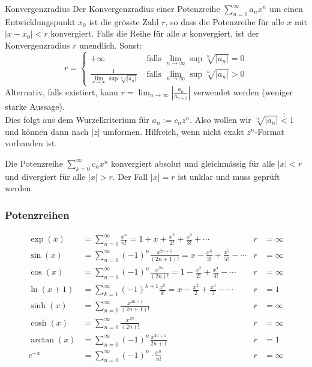 \documentclass[a4paper,10pt]{article}
\def\limn{\lim_{n\to \infty}}
\def\sumk{\sum_{k=1}^\infty}
\def\sumn{\sum_{n=0}^\infty}
\begin{document}
\begin{mainbox}{Konvergenzradius}
 Der Konvergenzradius einer Potenzreihe $\sumn a_n x^n$ um einen Entwicklungspunkt $x_0$ ist die grösste Zahl $r$, so dass die Potenzreihe für alle $x$ mit $|x - x_0| < r$ konvergiert. Falls die Reihe für alle $x$ konvergiert, ist der Konvergenzradius $r$ unendlich. Sonst:
 $$r = \begin{cases}
    +\infty & \text{ falls } \limn\sup \sqrt[n]{|a_n|} = 0\\
    \frac{1}{\limn\sup \sqrt[n]{|a_n|}} & \text{ falls }  \limn\sup \sqrt[n]{|a_n|} > 0
 \end{cases} $$
 Alternativ, falls existiert, kann $r = \limn \left| \frac{a_n}{a_{n+1}} \right|$ verwendet werden (weniger starke Aussage).\\
 Dies folgt aus dem Wurzelkriterium für $a_n := c_n z^n$. Also wollen wir $\sqrt[n]{|a_n|} \overset{!}{<} 1$ und können dann nach $|z|$ umformen. Hilfreich, wenn nicht exakt $z^n$-Format vorhanden ist.
\end{mainbox}
Die Potenzreihe $\sum_{k=0}^\infty c_n x^n$ konvergiert absolut und gleichmässig für alle $|x| < r$ und divergiert für alle $|x| > r$. Der Fall $|x| = r$ ist unklar und muss geprüft werden.

\subsubsection{Potenzreihen}
\begin{align*}
\exp(x) &= \sumn \frac{x^n}{n!} = 1 + x + \frac{x^2}{2!} + \frac{x^3}{3!} + \cdots & r &= \infty \\
\sin(x) &= \sumn (-1)^n \frac{x^{2n + 1}}{(2n + 1)!} = x - \frac{x^3}{3!} + \frac{x^5}{5!} - \cdots & r &= \infty \\
\cos(x) &= \sumn (-1)^n \frac{x^{2n}}{(2n)!} = 1 - \frac{x^2}{2!} + \frac{x^4}{4!} - \cdots & r &= \infty \\
\ln(x + 1) &= \sumk (-1)^{k+1} \frac{x^k}{k} = x - \frac{x^2}{2} + \frac{x^3}{3} - \cdots & r &= 1 \\
\sinh(x) &= \sumn \frac{x^{2n+1}}{(2n+1)!} & r &= \infty \\
\cosh(x) &= \sumn \frac{x^{2n}}{(2n)!} & r &= \infty \\
\arctan(x) &= \sumn (-1)^n \frac{x^{2n+1}}{2n+1} & r &= 1 \\
e^{-x} &= \sumn (-1)^n \cdot \frac{x^n}{n!} & r &= \infty \\
\end{align*}
\end{document}
